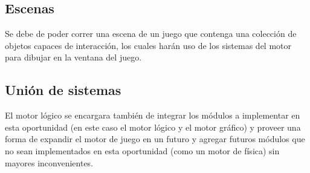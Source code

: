\subsection{Escenas}

Se debe de poder correr una escena de un juego que contenga una colección de objetos capaces de interacción, los cuales harán uso de los sistemas del motor para dibujar en la ventana del juego.

\subsection{Unión de sistemas}

El motor lógico se encargara también de integrar los módulos a implementar en esta oportunidad (en este caso el motor lógico y el motor gráfico) y proveer una forma de expandir el motor de juego en un futuro y agregar futuros módulos que no sean implementados en esta oportunidad (como un motor de física) sin mayores inconvenientes.
